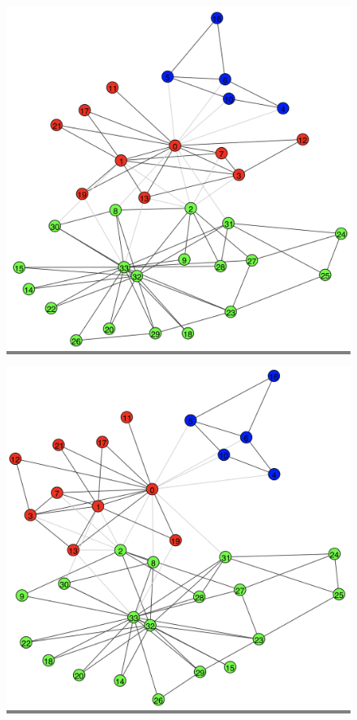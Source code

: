 \documentclass{article}
\begin{document}
\begin{figure}[h]
    \begin{minipage}{0.3\textwidth}
    \colorbox{gray}{\includegraphics[width=\linewidth]{./images/walktrap-cf.png}}
    \end{minipage}
    \hspace{\fill}
    \begin{minipage}{0.3\textwidth}
    \colorbox{gray}{\includegraphics[width=\linewidth]{./images/walktrap-sim.png}}

\end{minipage}
\end{figure}
\end{document}
